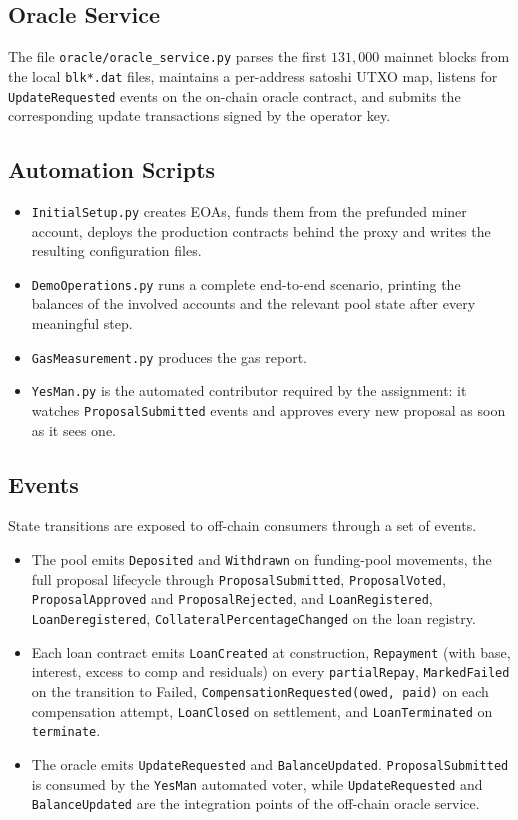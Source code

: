 \documentclass{report}
\begin{document}
\subsection*{Oracle Service}
The file \texttt{oracle/oracle\_service.py} parses the first $131{,}000$ mainnet blocks from the local \texttt{blk*.dat} files, maintains a per-address satoshi UTXO map, listens for \texttt{UpdateRequested} events on the on-chain oracle contract, and submits the corresponding update transactions signed by the operator key.

\subsection*{Automation Scripts}
\begin{itemize}
    \item \texttt{InitialSetup.py} creates EOAs, funds them from the prefunded miner account, deploys the production contracts behind the proxy and writes the resulting configuration files.
    \item \texttt{DemoOperations.py} runs a complete end-to-end scenario, printing the balances of the involved accounts and the relevant pool state after every meaningful step.
    \item \texttt{GasMeasurement.py} produces the gas report.
    \item \texttt{YesMan.py} is the automated contributor required by the assignment: it watches \texttt{ProposalSubmitted} events and approves every new proposal as soon as it sees one.
\end{itemize}

\subsection*{Events}
State transitions are exposed to off-chain consumers through a set of events. 
\begin{itemize}
    \item The pool emits \texttt{Deposited} and \texttt{Withdrawn} on funding-pool movements, the full proposal lifecycle through \texttt{ProposalSubmitted}, \texttt{ProposalVoted}, \texttt{ProposalApproved} and \texttt{ProposalRejected}, and \texttt{LoanRegistered}, \texttt{LoanDeregistered}, \texttt{CollateralPercentageChanged} on the loan registry.
    \item Each loan contract emits \texttt{LoanCreated} at construction, \texttt{Repayment} (with base, interest, excess to comp and residuals) on every \texttt{partialRepay}, \texttt{MarkedFailed} on the transition to Failed, \texttt{CompensationRequested(owed, paid)} on each compensation attempt, \texttt{LoanClosed} on settlement, and \texttt{LoanTerminated} on \texttt{terminate}. 
    \item The oracle emits \texttt{UpdateRequested} and \texttt{BalanceUpdated}. \texttt{ProposalSubmitted} is consumed by the \texttt{YesMan} automated voter, while \texttt{UpdateRequested} and \texttt{BalanceUpdated} are the integration points of the off-chain oracle service.
\end{itemize}
\end{document}
